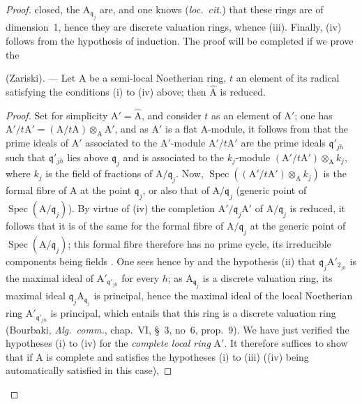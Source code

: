 \begin{proof}

closed, the $\mathrm{A}_{\mathfrak{q}_j}$ are, and one knows (\emph{loc.\ cit.}) that these rings are of dimension~1, hence they are discrete valuation rings, whence (iii). Finally, (iv) follows from the hypothesis of induction. The proof will be completed if we prove the

\begin{lemma}[7.6.4.1]
\label{IV.7.6.4.1}
(Zariski). --- Let $\mathrm{A}$ be a semi-local Noetherian ring, $t$ an element of its radical satisfying the conditions (i) to (iv) above; then $\widehat{\mathrm{A}}$ is reduced.
\end{lemma}

\begin{proof}
Set for simplicity $\mathrm{A}'=\widehat{\mathrm{A}}$, and consider $t$ as an element of $\mathrm{A}'$; one has $\mathrm{A}'/t\mathrm{A}'=(\mathrm{A}/t\mathrm{A})\otimes_\mathrm{A}\mathrm{A}'$, and as $\mathrm{A}'$ is a flat $\mathrm{A}$-module, it follows from  that the prime ideals of $\mathrm{A}'$ associated to the $\mathrm{A}'$-module $\mathrm{A}'/t\mathrm{A}'$ are the prime ideals $\mathfrak{q}'_{jh}$ such that $\mathfrak{q}'_{jh}$ lies above $\mathfrak{q}_j$ and is associated to the $k_j$-module $(\mathrm{A}'/t\mathrm{A}')\otimes_\mathrm{A} k_j$, where $k_j$ is the field of fractions of $\mathrm{A}/\mathfrak{q}_j$. Now, $\operatorname{Spec}((\mathrm{A}'/t\mathrm{A}')\otimes_\mathrm{A} k_j)$ is the formal fibre of $\mathrm{A}$ at the point $\mathfrak{q}_j$, or also that of $\mathrm{A}/\mathfrak{q}_j$ (generic point of $\operatorname{Spec}(\mathrm{A}/\mathfrak{q}_j)$). By virtue of (iv) the completion $\mathrm{A}'/\mathfrak{q}_j\mathrm{A}'$ of $\mathrm{A}/\mathfrak{q}_j$ is reduced, it follows that it is of the same for the formal fibre of $\mathrm{A}/\mathfrak{q}_j$ at the generic point of $\operatorname{Spec}(\mathrm{A}/\mathfrak{q}_j)$; this formal fibre therefore has no prime cycle, its irreducible components being fields . One sees hence by  and the hypothesis (ii) that $\mathfrak{q}_j\mathrm{A}'_{2_{jh}}$ is the maximal ideal of $\mathrm{A}'_{\mathfrak{q}'_{jh}}$ for every $h$; as $\mathrm{A}_{\mathfrak{q}_j}$ is a discrete valuation ring, its maximal ideal $\mathfrak{q}_j\mathrm{A}_{\mathfrak{q}_j}$ is principal, hence the maximal ideal of the local Noetherian ring $\mathrm{A}'_{\mathfrak{q}'_{jh}}$ is principal, which entails that this ring is a discrete valuation ring (Bourbaki, \emph{Alg.\ comm.}, chap.~VI, \S~3, no~6, prop.~9). We have just verified the hypotheses (i) to (iv) for the \emph{complete local ring} $\mathrm{A}'$. It therefore suffices to show that if $\mathrm{A}$ is complete and satisfies the hypotheses (i) to (iii) ((iv) being automatically satisfied in this case),


\end{proof}
\end{proof}
